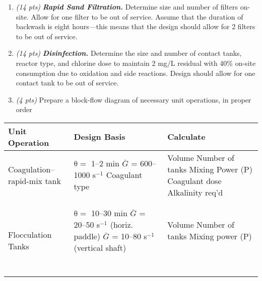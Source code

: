 \documentclass[11pt,letterpaper]{article}
\begin{document}
\begin{enumerate}
\begin{itemize}
\begin{enumerate}
\item\emph{(14 pts)} \emph{\textbf{Rapid Sand Filtration.}} Determine size and number of filters on-site.  Allow for one filter to be out of service.  Assume that the duration of backwash is eight hours---this means that the design should allow for 2 filters to be out of service.

\item \emph{(14 pts)} \emph{\textbf{Disinfection.}} Determine the size and number of contact tanks, reactor type, and chlorine dose to maintain 2 mg/L residual with 40\% on-site consumption due to oxidation and side reactions.  Design should allow for one contact tank to be out of service.
\item \emph{(4 pts)} Prepare a block-flow diagram of necessary unit operations, in proper order
 
\end{enumerate}

\end{itemize}


\vspace{0.2in}


\begin{minipage}{\linewidth}
\centering
{} \label{tab:title}

\begin{tabular}{|p{50mm}|p{70mm}|p{30mm}|}\toprule[1.25pt]
\bf Unit Operation	& \bf Design Basis 	& \bf Calculate	\\\midrule
Coagulation--rapid-mix tank	& $\mathrm{\theta =}$ 1--2 min \newline $\bar{G}$ = 600--1000 s$^{-1}$ \newline Coagulant type & Volume \newline Number of tanks \newline Mixing Power (P) \newline Coagulant dose \newline Alkalinity req'd\\ \hline\

Flocculation Tanks 	& $\mathrm{\theta =}$ 10--30 min \newline $\bar{G}$ = 20--50 s$^{-1}$ (horiz. paddle) \newline $\bar{G}$ = 10--80 s$^{-1}$ (vertical shaft)	& Volume \newline Number of tanks \newline Mixing power (P)\\ \hline\


\end{tabular}
\end{minipage}
\end{enumerate}
\end{document}
